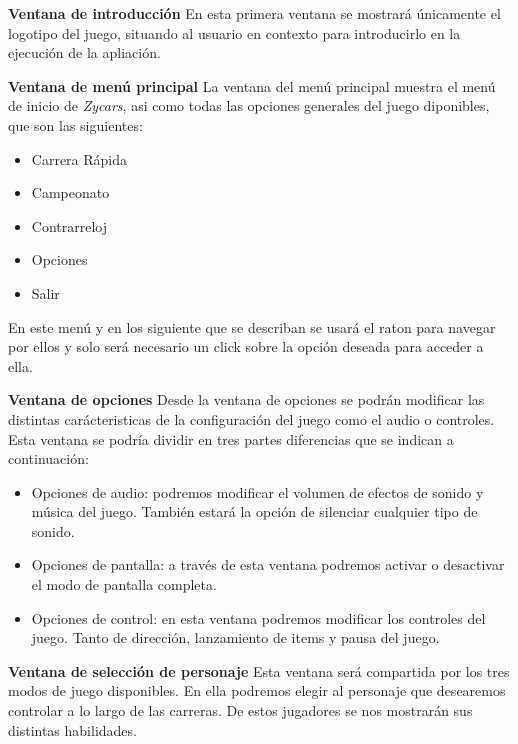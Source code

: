 \begin{description}
    \item \textbf{Ventana de introducción} En esta primera ventana se mostrará únicamente el logotipo del juego, situando al usuario en
    contexto para introducirlo en la ejecución de la apliación.
    
    \item \textbf{Ventana de menú principal} La ventana del menú principal muestra el menú de inicio de \emph{Zycars}, asi como 
    todas las opciones generales del juego diponibles, que son las siguientes:
        \begin{itemize}
            \item Carrera Rápida
            \item Campeonato
            \item Contrarreloj
            \item Opciones
            \item Salir
        \end{itemize}
        En este menú y en los siguiente que se describan se usará el raton para navegar por ellos y solo será necesario
        un click sobre la opción deseada para acceder a ella.
    
    \item \textbf{Ventana de opciones} Desde la ventana de opciones se podrán modificar las distintas carácteristicas de la 
    configuración del juego como el audio o controles. Esta ventana se podría dividir en tres partes diferencias que se indican
    a continuación:
        \begin{itemize}
            \item Opciones de audio: podremos modificar el volumen de efectos de sonido y música del juego. También estará la opción
            de silenciar cualquier tipo de sonido.
            
            \item Opciones de pantalla: a través de esta ventana podremos activar o desactivar el modo de pantalla completa.
            
            \item Opciones de control: en esta ventana podremos modificar los controles del juego. Tanto de dirección, lanzamiento
            de items y pausa del juego.
        \end{itemize}
    
    \item \textbf{Ventana de selección de personaje} Esta ventana será compartida por los tres modos de juego disponibles. En ella 
    podremos elegir al personaje que desearemos controlar a lo largo de las carreras. De estos jugadores se nos mostrarán sus 
    distintas habilidades.
    

\end{description}
